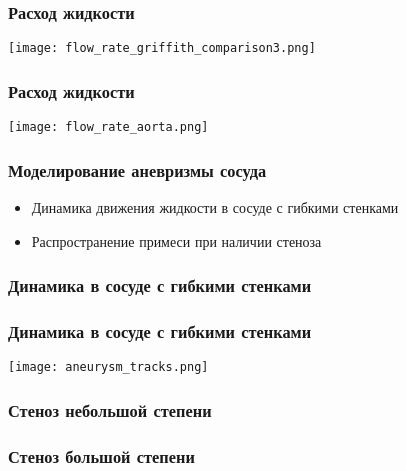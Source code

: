 \documentclass[14pt]{beamer}
\begin{document}
\begin{frame}
\frametitle{Расход жидкости}
    \begin{center}
        \texttt{[image: flow\_rate\_griffith\_comparison3.png]}
    \end{center}
\end{frame}

\begin{frame}
\frametitle{Расход жидкости}
    \begin{center}
        \texttt{[image: flow\_rate\_aorta.png]}
    \end{center}
\end{frame}

\begin{frame}
\frametitle{Моделирование аневризмы сосуда}
    \begin{itemize}
        \item[\MVRightarrow] Динамика движения жидкости в сосуде с гибкими стенками
        \item[\MVRightarrow] Распространение примеси при наличии стеноза
    \end{itemize}
\end{frame}

\begin{frame}
\frametitle{Динамика в сосуде с гибкими стенками}
\end{frame}

\begin{frame}
\frametitle{Динамика в сосуде с гибкими стенками}
    \begin{center}
        \texttt{[image: aneurysm\_tracks.png]}
    \end{center}
\end{frame}

\begin{frame}
\frametitle{Стеноз небольшой степени}
\end{frame}

\begin{frame}
\frametitle{Стеноз большой степени}
\end{frame}
\end{document}
